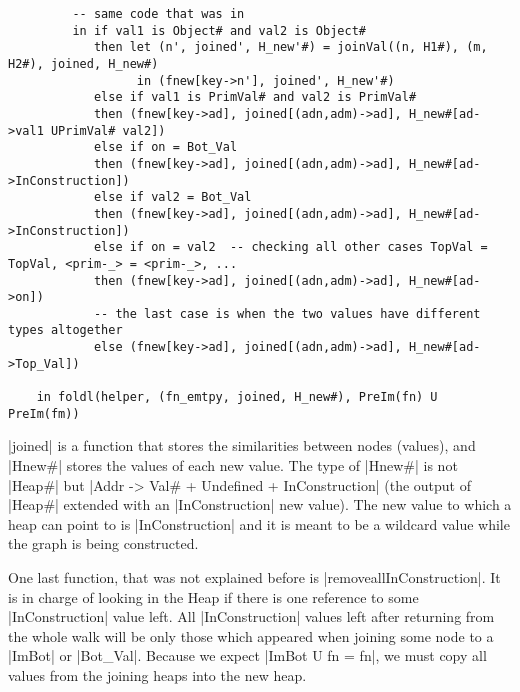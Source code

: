 \begin{verbatim}
         -- same code that was in
         in if val1 is Object# and val2 is Object#
            then let (n', joined', H_new'#) = joinVal((n, H1#), (m, H2#), joined, H_new#)
                  in (fnew[key->n'], joined', H_new'#)
            else if val1 is PrimVal# and val2 is PrimVal#
            then (fnew[key->ad], joined[(adn,adm)->ad], H_new#[ad->val1 UPrimVal# val2])
            else if on = Bot_Val
            then (fnew[key->ad], joined[(adn,adm)->ad], H_new#[ad->InConstruction])
            else if val2 = Bot_Val
            then (fnew[key->ad], joined[(adn,adm)->ad], H_new#[ad->InConstruction])
            else if on = val2  -- checking all other cases TopVal = TopVal, <prim-_> = <prim-_>, ...
            then (fnew[key->ad], joined[(adn,adm)->ad], H_new#[ad->on])
            -- the last case is when the two values have different types altogether
            else (fnew[key->ad], joined[(adn,adm)->ad], H_new#[ad->Top_Val])

    in foldl(helper, (fn_emtpy, joined, H_new#), PreIm(fn) U PreIm(fm))
\end{verbatim}

{}

\pycode|joined| is a function that stores the similarities between nodes
(values), and \pycode|Hnew#| stores the values of each new value. The
type of \pycode|Hnew#| is not \pycode|Heap#| but
\pycode|Addr -> Val# + Undefined + InConstruction|
(the output of \pycode|Heap#| extended with an \pycode|InConstruction|
new value). The new value to which a heap can point to is
\pycode|InConstruction| and it is meant to be a wildcard value while the
graph is being constructed.

{}

One last function, that was not explained before is
\pycode|removeallInConstruction|. It is in charge of looking in the Heap
if there is one reference to some \pycode|InConstruction| value left.
All \pycode|InConstruction| values left after returning from the whole
walk will be only those which appeared when joining some node to a
\pycode|ImBot| or \pycode|Bot_Val|. Because we expect
\pycode|ImBot U fn = fn|, we must copy all values from the joining
heaps into the new heap.

